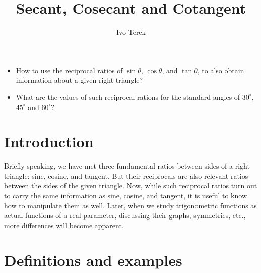 \documentclass{ximera}
\author{Ivo Terek}
\title{Secant, Cosecant and Cotangent}
\begin{document}
\begin{abstract}
  
\end{abstract}
\maketitle



\begin{motivatingQuestions}\begin{itemize}
\item How to use the reciprocal ratios of $\sin\theta$, $\cos\theta$, and $\tan\theta$, to also obtain information about a given right triangle?
\item What are the values of such reciprocal rations for the standard angles of $30^\circ$, $45^\circ$ and $60^\circ$?
\end{itemize}\end{motivatingQuestions}



\section{Introduction}

Briefly speaking, we have met three fundamental ratios between sides of a right triangle: sine, cosine, and tangent. But their reciprocals are also relevant ratios between the sides of the given triangle. Now, while such reciprocal ratios turn out to carry the same information as sine, cosine, and tangent, it is useful to know how to manipulate them as well. Later, when we study trigonometric functions as actual functions of a real parameter, discussing their graphs, symmetries, etc., more differences will become apparent.


\section{Definitions and examples}
\end{document}
